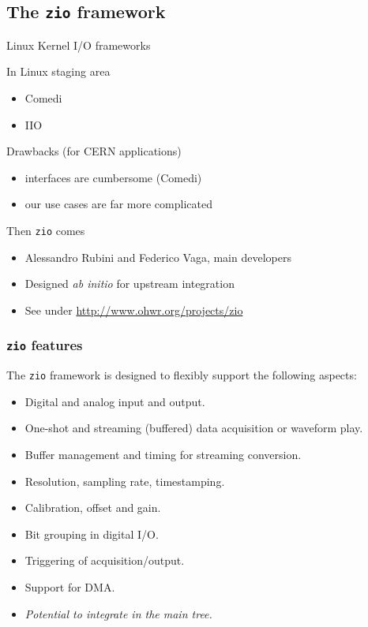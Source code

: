 \documentclass[compress,red]{beamer}
\begin{document}
\subsection{The \texttt{zio} framework}

\begin{frame}{Linux Kernel I/O frameworks}

\pause
\begin{block}{In Linux staging area}
\begin{itemize}
\item Comedi
\item IIO
\end{itemize}
\end{block}

\pause
\begin{block}{Drawbacks (for CERN applications)}
\begin{itemize}
\item interfaces are cumbersome (Comedi)
\item our use cases are far more complicated
\end{itemize}
\end{block}

\pause
\begin{block}{Then \texttt{zio} comes}
\begin{itemize}
\item Alessandro Rubini and Federico Vaga, main developers
\item Designed \emph{ab initio} for upstream integration
\item See under \url{http://www.ohwr.org/projects/zio}
\end{itemize}
\end{block}

\end{frame}

\begin{frame}
\frametitle{\texttt{zio} features}

The \texttt{zio} framework is designed to flexibly support the following
aspects:
\begin{itemize}
\pause\item Digital and analog input and output.
\pause\item One-shot and streaming (buffered) data acquisition or waveform play.
\pause\item Buffer management and timing for streaming conversion.
\pause\item Resolution, \pause sampling rate, \pause timestamping.
\pause\item Calibration, \pause offset \pause and gain.
\pause\item Bit grouping in digital I/O.
\pause\item Triggering of acquisition/output.
\pause\item Support for DMA.
\pause\item \emph{Potential to integrate in the main tree.}
\end{itemize}

\end{frame}
\end{document}
